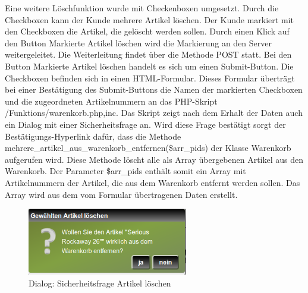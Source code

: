Eine weitere Löschfunktion wurde mit Checkenboxen umgesetzt. Durch die Checkboxen kann der Kunde mehrere Artikel löschen. Der Kunde markiert mit den Checkboxen die Artikel, die gelöscht werden sollen. Durch einen Klick auf den Button \glqq Markierte Artikel löschen\grqq{} wird die Markierung an den Server weitergeleitet. Die Weiterleitung findet über die Methode \glqq POST\grqq{} statt. Bei den Button \glqq Markierte Artikel löschen\grqq{} handelt es sich um einen Submit-Button. Die Checkboxen befinden sich in einen HTML-Formular. Dieses Formular überträgt bei einer Bestätigung des Submit-Buttons die Namen  der markierten Checkboxen und die zugeordneten Artikelnummern an das PHP-Skript \glqq /Funktions/warenkorb.php,inc\grqq{}. Das Skript zeigt nach dem Erhalt der Daten auch ein Dialog mit einer Sicherheitsfrage an. Wird diese Frage bestätigt sorgt der Bestätigungs-Hyperlink dafür, dass die Methode \glqq mehrere\_artikel\_aus\_warenkorb\_entfernen(\$arr\_pids)\grqq{} der Klasse \glqq Warenkorb\grqq{} aufgerufen wird. Diese Methode löscht alle als Array übergebenen Artikel aus den Warenkorb. Der Parameter \glqq \$arr\_pids\grqq{} enthält somit ein Array mit Artikelnummern der Artikel, die aus dem Warenkorb entfernt werden sollen. Das Array wird aus dem vom Formular übertragenen Daten erstellt.

\begin{figure}[H]
	\begin{center}
			\includegraphics[width=70mm]{Bilder/sicherheitsfrage_artikel_loeschen.png}
	\end{center}
	\caption{Dialog: Sicherheitsfrage Artikel löschen}
\end{figure}

